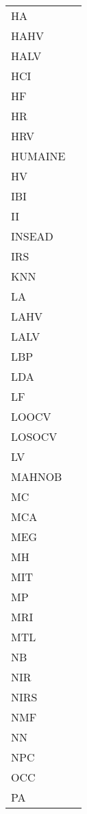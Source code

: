\begin{tabular}{ll}
          HA &         \\
        HAHV &         \\
        HALV &         \\
         HCI &         \\
          HF &         \\
          HR &         \\
         HRV &         \\
     HUMAINE &         \\
          HV &         \\
         IBI &         \\
          II &         \\
      INSEAD &         \\
         IRS &         \\
         KNN &         \\
          LA &         \\
        LAHV &         \\
        LALV &         \\
         LBP &         \\
         LDA &         \\
          LF &         \\
       LOOCV &         \\
      LOSOCV &         \\
          LV &         \\
      MAHNOB &         \\
          MC &         \\
         MCA &         \\
         MEG &         \\
          MH &         \\
         MIT &         \\
          MP &         \\
         MRI &         \\
         MTL &         \\
          NB &         \\
         NIR &         \\
        NIRS &         \\
         NMF &         \\
          NN &         \\
         NPC &         \\
         OCC &         \\
          PA &         \\

\end{tabular}
